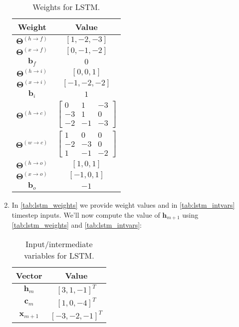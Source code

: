 \documentclass[12pt, letterpaper]{article}
\begin{document}
\begin{enumerate}

\begin{table}[h!]
    \centering
    \begin{tabular}{|cc|}
    \toprule
    \textbf{Weight} & \textbf{Value} \\
    \midrule
    $\boldsymbol{\Theta}^{(h\rightarrow f)}$ & $[1,-2,-3]$ \\
    $\boldsymbol{\Theta}^{(x\rightarrow f)}$ & $[0,-1,-2]$ \\
    $\boldsymbol{b}_f$ & $0$ \\
    $\boldsymbol{\Theta}^{(h\rightarrow i)}$ & $[0,0,1]$\\
    $\boldsymbol{\Theta}^{(x\rightarrow i)}$ & $[-1,-2,-2]$\\
    $\boldsymbol{b}_i$ & $1$ \\
    $\boldsymbol{\Theta}^{(h\rightarrow c)}$ & $\begin{bmatrix}
    0 & 1 & -3\\
    -3 & 1 & 0\\
    -2 & -1 & -3
        \end{bmatrix}$ \\
    $\boldsymbol{\Theta}^{(w\rightarrow c)}$ & $\begin{bmatrix}
    1 & 0 & 0 \\
    -2 & -3 & 0\\
    1 & -1 & -2 \end{bmatrix}$ \\
    $\boldsymbol{\Theta}^{(h\rightarrow o)}$ & $[1,0,1]$\\
    $\boldsymbol{\Theta}^{(x\rightarrow o)}$ & $[-1,0,1]$\\
    $\boldsymbol{b}_o$ & $-1$ \\
    \bottomrule
    \end{tabular}
    \caption{Weights for LSTM.}
    \label{tab:lstm_weights}
\end{table}

\item In \autoref{tab:lstm_weights} we provide weight values and in \autoref{tab:lstm_intvars} timestep inputs. We'll now compute the value of $\boldsymbol{h}_{m+1}$ using \autoref{tab:lstm_weights} and \autoref{tab:lstm_intvars}: 

\begin{table}[h!]
    \centering
    \begin{tabular}{|cc|}
    \toprule
    \textbf{Vector} & \textbf{Value} \\
    \midrule
    $\boldsymbol{h}_m$ & $[3,1,-1]^T$ \\
    $\boldsymbol{c}_m$ & $[1,0,-4]^T$ \\
    $\boldsymbol{x}_{m+1}$ & $[-3,-2,-1]^T$ \\
    \bottomrule
    \end{tabular}
    \caption{Input/intermediate variables for LSTM.}
    \label{tab:lstm_intvars}
\end{table}


\end{enumerate}
\end{document}
